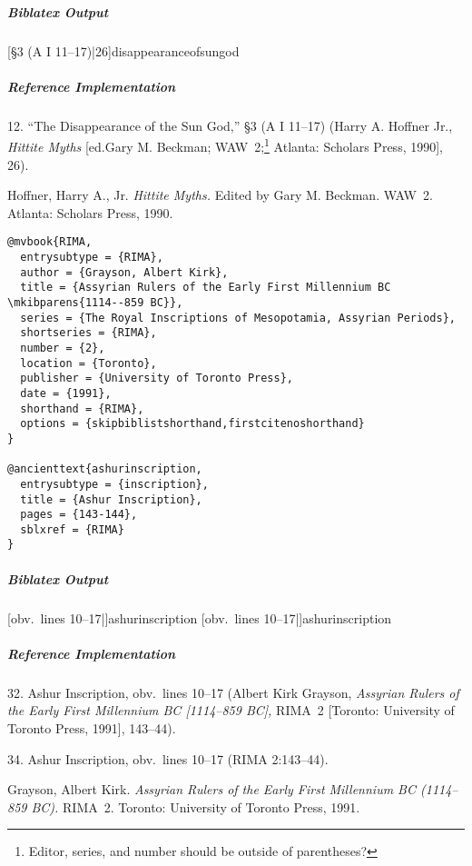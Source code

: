 \documentclass[a4paper]{article}
\newenvironment{biboutput}{%
  \subparagraph{Biblatex Output}
}{\color{black}}
\newenvironment{refimp}{%
  \subparagraph{Reference Implementation}
  \color{reference-colour}
  \rm
}{\par\color{black}}
\begin{document}
\begin{biboutput}
  [§3 (A I 11--17)|26]{disappearanceofsungod}
\end{biboutput}

\begin{refimp}
  \hspace*{\bibindent}12. “The Disappearance of the Sun God,” §3 (A I 11–17)
  (Harry A. Hoffner Jr., \emph{Hittite Myths} [ed.\@ Gary M. Beckman;
  WAW~2;\footnote{Editor, series, and number should be outside of
  parentheses?} Atlanta: Scholars Press, 1990], 26).
  
  \hangindent\bibindent Hoffner, Harry A., Jr. \emph{Hittite Myths.} Edited by
  Gary M. Beckman. WAW~2. Atlanta: Scholars Press, 1990.

\end{refimp}

\medskip

\begin{lstlisting}
@mvbook{RIMA,
  entrysubtype = {RIMA},
  author = {Grayson, Albert Kirk},
  title = {Assyrian Rulers of the Early First Millennium BC \mkibparens{1114--859 BC}},
  series = {The Royal Inscriptions of Mesopotamia, Assyrian Periods},
  shortseries = {RIMA},
  number = {2},
  location = {Toronto},
  publisher = {University of Toronto Press},
  date = {1991},
  shorthand = {RIMA},
  options = {skipbiblistshorthand,firstcitenoshorthand}
}

@ancienttext{ashurinscription,
  entrysubtype = {inscription},
  title = {Ashur Inscription},
  pages = {143-144},
  sblxref = {RIMA}
}
\end{lstlisting}

\begin{biboutput}
  [obv.\ lines 10--17|]{ashurinscription}
  [obv.\ lines 10--17|]{ashurinscription}
\end{biboutput}

\begin{refimp}
  \hspace*{\bibindent}32. Ashur Inscription, obv.\ lines 10–17 (Albert Kirk
  Grayson, \emph{Assyrian Rulers of the Early First Millennium BC [1114–859
  BC],} RIMA~2 [Toronto: University of Toronto Press, 1991], 143–44).

  \hspace*{\bibindent}34. Ashur Inscription, obv.\ lines 10–17 (RIMA
  2:143–44).

  \hangindent\bibindent Grayson, Albert Kirk. \emph{Assyrian Rulers of the
  Early First Millennium BC (1114–859 BC).} RIMA~2. Toronto: University of
  Toronto Press, 1991.

\end{refimp}
\end{document}
